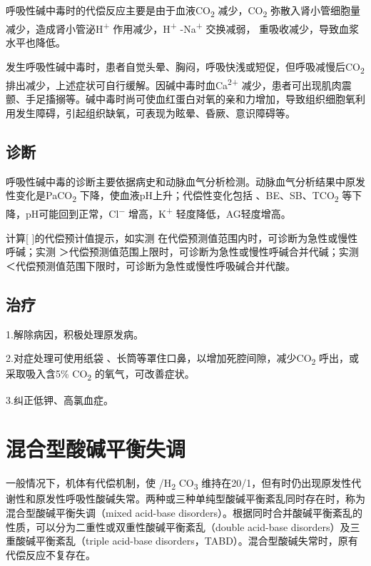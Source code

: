 呼吸性碱中毒时的代偿反应主要是由于血液CO\textsubscript{2}
减少，CO\textsubscript{2}
弥散入肾小管细胞量减少，造成肾小管泌H\textsuperscript{+}
作用减少，H\textsuperscript{+} -Na\textsuperscript{+} 交换减弱，{}
重吸收减少，导致血浆{} 水平也降低。

发生呼吸性碱中毒时，患者自觉头晕、胸闷，呼吸快浅或短促，但呼吸减慢后CO\textsubscript{2}
排出减少，上述症状可自行缓解。因碱中毒时血Ca\textsuperscript{2+}
减少，患者可出现肌肉震颤、手足搐搦等。碱中毒时尚可使血红蛋白对氧的亲和力增加，导致组织细胞氧利用发生障碍，引起组织缺氧，可表现为眩晕、昏厥、意识障碍等。

\subsection{诊断}

呼吸性碱中毒的诊断主要依据病史和动脉血气分析检测。动脉血气分析结果中原发性变化是PaCO\textsubscript{2}
下降，使血液pH上升；代偿性变化包括{} 、BE、SB、TCO\textsubscript{2}
等下降，pH可能回到正常，Cl\textsuperscript{−} 增高，K\textsuperscript{+}
轻度降低，AG轻度增高。

计算{[}{} {]}的代偿预计值提示，如实测{}
在代偿预测值范围内时，可诊断为急性或慢性呼碱；实测{}
＞代偿预测值范围上限时，可诊断为急性或慢性呼碱合并代碱；实测{}
＜代偿预测值范围下限时，可诊断为急性或慢性呼吸碱合并代酸。

\subsection{治疗}

1.解除病因，积极处理原发病。

2.对症处理可使用纸袋
、长筒等罩住口鼻，以增加死腔间隙，减少CO\textsubscript{2}
呼出，或采取吸入含5\% CO\textsubscript{2} 的氧气，可改善症状。

3.纠正低钾、高氯血症。

\protect\hypertarget{text00208.html}{}{}

\section{混合型酸碱平衡失调}

一般情况下，机体有代偿机制，使{} /H\textsubscript{2} CO\textsubscript{3}
维持在20/1，但有时仍出现原发性代谢性和原发性呼吸性酸碱失常。两种或三种单纯型酸碱平衡紊乱同时存在时，称为混合型酸碱平衡失调（mixed
acid-base
disorders）。根据同时合并酸碱平衡紊乱的性质，可以分为二重性或双重性酸碱平衡紊乱（double
acid-base disorders）及三重酸碱平衡紊乱（triple acid-base
disorders，TABD）。混合型酸碱失常时，原有代偿反应不复存在。

